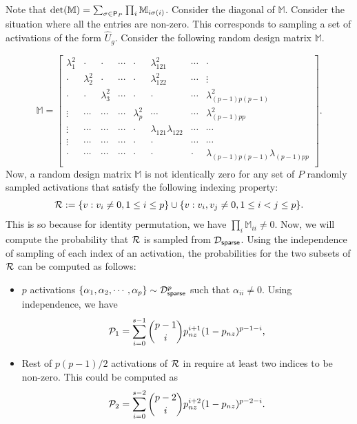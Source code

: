     
    
    Note that $\det(\mathbb{M}) = \sum_{\sigma \in \sf{P}_P} \prod_i \mathbb{M}_{i \sigma(i)}$. Consider the diagonal of $\mathbb{M}$. Consider the situation where all the entries are non-zero. This corresponds to sampling a set of activations of the form $\widehat{U}_g$. Consider the following random design matrix $\mathbb{M}$.

    \[
\mathbb{M} = \begin{bmatrix}
\lambda_1^2 & \cdot & \cdot & \cdots & \cdot &\lambda_{121}^2 & \cdots & \cdot\\
\cdot & \lambda_2^2 & \cdot & \cdots & \cdot &\lambda_{122}^2 & \cdots & \vdots\\
\cdot & \cdot & \lambda_3^2 & \cdots & \cdot &\cdot & \cdots & \lambda_{(p-1)p(p-1)}^2\\
\vdots & \cdots & \cdots & \cdots & \lambda_p^2 & \cdots & \cdots & \lambda_{(p-1)pp}^2\\
\vdots & \cdots & \cdots & \cdots & \cdot & \lambda_{121}\lambda_{122} & \cdots & \cdots\\
\vdots & \cdots & \cdots & \cdots & \cdot & \cdot & \cdots & \cdots\\
\cdot & \cdots & \cdots & \cdots & \cdot & \cdot & \cdot & \lambda_{(p-1)p(p-1)}\lambda_{(p-1)pp}\\
\end{bmatrix}.
\]
Now, a random design matrix $\mathbb{M}$ is not identically zero for any set of $P$ randomly sampled activations that satisfy the following indexing property:
    \begin{align}
        \cR := \{v: v_i \neq 0, 1 \leq i \leq p\} \cup \{v: v_i,v_j \neq 0,  1 \leq i < j \leq p \}. \label{eq: random}
    \end{align}
    This is so because for identity permutation, we have $\prod_{i} \mathbb{M}_{ii} \neq 0$.
    Now, we will compute the probability that $\cR$ is sampled from $\cD_{\sf{sparse}}$. Using the independence of sampling of each index of an activation, the probabilities for the two subsets of $\cR$ can be computed as follows:
    \begin{itemize}
        \item $p$ activations $\curlybracket{\alpha_1, \alpha_2,\cdots, \alpha_p} \sim \cD_{\sf{sparse}}^p$ such that $\alpha_{ii} \neq 0$. Using independence, we have $$\cP_1 = \sum_{i = 0}^{s-1} \binom{p-1}{i} p_{nz}^{i+1} (1 - p_{nz})^{p-1-i},$$
        \item Rest of $p(p-1)/2$ activations of $\cR$ in  require at least two indices to be non-zero. This could be computed as $$\cP_2 = \sum_{i = 0}^{s-2} \binom{p-2}{i} p_{nz}^{i+2} (1 - p_{nz})^{p-2-i}.$$
    \end{itemize}
